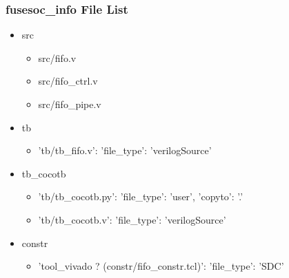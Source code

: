 \subsubsection{fusesoc\_info File List}
\begin{itemize}
\item src
	\begin{itemize}
	\item src/fifo.v
	\item src/fifo\_ctrl.v
	\item src/fifo\_pipe.v
	\end{itemize}
\item tb
	\begin{itemize}
	\item {'tb/tb\_fifo.v': {'file\_type': 'verilogSource'}}
	\end{itemize}
\item tb\_cocotb
	\begin{itemize}
	\item {'tb/tb\_cocotb.py': {'file\_type': 'user', 'copyto': '.'}}
	\item {'tb/tb\_cocotb.v': {'file\_type': 'verilogSource'}}
	\end{itemize}
\item constr
	\begin{itemize}
	\item {'tool\_vivado ? (constr/fifo\_constr.tcl)': {'file\_type': 'SDC'}}
	\end{itemize}
\end{itemize}
